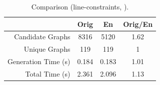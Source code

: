 \begin{table}[!ht]
\centering
\caption{Comparison (line-constraints, ).\label{tb:app1:lines-ex2}}
\begin{tabular}{r | c | c | c}
\hline \hline
& Orig & En & Orig/En \\
\hline
Candidate Graphs & 8316 & 5120 & 1.62 \\
Unique Graphs & 119  & 119 & 1 \\
Generation Time (s) & 0.184 & 0.183 & 1.01 \\
Total Time (s) & 2.361 & 2.096 & 1.13 \\
\hline \hline
\end{tabular}
\end{table}